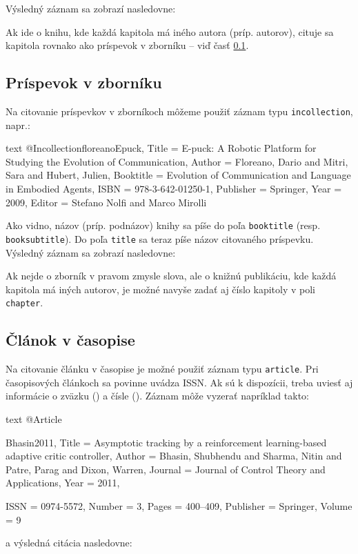 Výsledný záznam sa zobrazí nasledovne:

\noindent[X] 

Ak ide o knihu, kde každá kapitola má iného autora (príp. autorov), cituje sa kapitola rovnako ako príspevok v zborníku -- viď časť \ref{sec:inproc}.

\subsection{Príspevok v zborníku}
\label{sec:inproc}

Na citovanie príspevkov v zborníkoch môžeme použiť záznam typu \texttt{incollection}, napr.:
\begin{inlinecode}[breaklines]{text}
@Incollection{floreanoEpuck,
  Title                    = {E-puck: A Robotic Platform for Studying the Evolution of Communication},
  Author                   = {Floreano, Dario and Mitri, Sara and Hubert, Julien},
  Booktitle                = {Evolution of Communication and Language in Embodied Agents},
  ISBN                     = {978-3-642-01250-1},
  Publisher                = {Springer},
  Year                     = {2009},
  Editor                   = {Stefano Nolfi and Marco Mirolli}
}
\end{inlinecode}

Ako vidno, názov (príp. podnázov) knihy sa píše do poľa \texttt{booktitle} (resp. \texttt{booksubtitle}). Do poľa \texttt{title} sa teraz píše názov citovaného príspevku. Výsledný záznam sa zobrazí nasledovne:

\noindent[X] 

Ak nejde o zborník v pravom zmysle slova, ale o knižnú publikáciu, kde každá kapitola má iných autorov, je možné navyše zadať aj číslo kapitoly v poli \texttt{chapter}.

\subsection{Článok v časopise}

Na citovanie článku v časopise je možné použiť záznam typu \texttt{article}. Pri časopisových článkoch sa povinne uvádza ISSN. Ak sú k dispozícii, treba uviesť aj informácie o zväzku () a čísle (). Záznam môže vyzerať napríklad takto:
\begin{inlinecode}[breaklines]{text}
@Article{Bhasin2011,
  Title                    = {Asymptotic tracking by a reinforcement learning-based adaptive critic controller},
  Author                   = {Bhasin, Shubhendu and Sharma, Nitin and Patre, Parag and Dixon, Warren},
  Journal                  = {Journal of Control Theory and Applications},
  Year                     = {2011},

  ISSN                     = {0974-5572},
  Number                   = {3},
  Pages                    = {400--409},
  Publisher                = {Springer},
  Volume                   = {9}
}
\end{inlinecode}
a výsledná citácia nasledovne:

